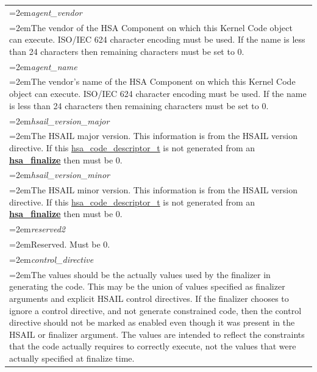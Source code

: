 \documentclass[final]{book}
\newcommand{\reffun}[1]{\textbf{#1}}
\newcommand{\reffld}[1]{\textit{#1}}
\begin{document}
\begin{appendices}
\begin{longtable}{@{}>{\hangindent=2em}p{\textwidth}}
\reffld{agent_vendor}\\\hspace{2em}The vendor of the HSA Component on which this Kernel Code object can execute. ISO/IEC 624 character encoding must be used. If the name is less than 24 characters then remaining characters must be set to 0.\\[2mm]
\reffld{agent_name}\\\hspace{2em}The vendor's name of the HSA Component on which this Kernel Code object can execute. ISO/IEC 624 character encoding must be used. If the name is less than 24 characters then remaining characters must be set to 0.\\[2mm]
\reffld{hsail_version_major}\\\hspace{2em}The HSAIL major version. This information is from the HSAIL version directive. If this \hyperlink{group--FinalizerCoreApi-1ga867c6b6dcaa193e321529590eb5df130}{hsa_code_descriptor_t} is not generated from an \hyperlink{group--FinalizerCoreApi-1gaa5d57be415da1b4562e9eee962439b4b}{\reffun{hsa_finalize}} then must be 0.\\[2mm]
\reffld{hsail_version_minor}\\\hspace{2em}The HSAIL minor version. This information is from the HSAIL version directive. If this \hyperlink{group--FinalizerCoreApi-1ga867c6b6dcaa193e321529590eb5df130}{hsa_code_descriptor_t} is not generated from an \hyperlink{group--FinalizerCoreApi-1gaa5d57be415da1b4562e9eee962439b4b}{\reffun{hsa_finalize}} then must be 0.\\[2mm]
\reffld{reserved2}\\\hspace{2em}Reserved. Must be 0.\\[2mm]
\reffld{control_directive}\\\hspace{2em}The values should be the actually values used by the finalizer in generating the code. This may be the union of values specified as finalizer arguments and explicit HSAIL control directives. If the finalizer chooses to ignore a control directive, and not generate constrained code, then the control directive should not be marked as enabled even though it was present in the HSAIL or finalizer argument. The values are intended to reflect the constraints that the code actually requires to correctly execute, not the values that were actually specified at finalize time.
\end{longtable}




\end{appendices}
\end{document}
